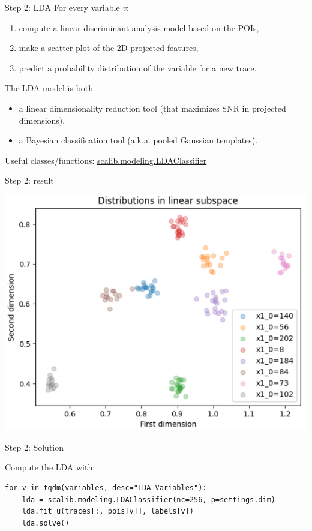 \documentclass[aspectratio=169]{beamer}
\begin{document}
\begin{frame}{Step 2: LDA}
    For every variable $v$:
    \begin{enumerate}
        \item compute a linear discriminant analysis model based on the POIs,
        \item make a scatter plot of the 2D-projected features,
        \item predict a probability distribution of the variable for a new trace.
    \end{enumerate}

    The LDA model is both
    \begin{itemize}
        \item a linear dimensionality reduction tool (that maximizes SNR in projected dimensions),
        \item a Bayesian classification tool (a.k.a. pooled Gaussian templates).
    \end{itemize}

    Useful classes/functions:
    \href{https://scalib.readthedocs.io/en/stable/source/api/scalib.modeling.LDAClassifier.html}{scalib.modeling.LDAClassifier}
\end{frame}

\begin{frame}{Step 2: result}
    \begin{center}
        \includegraphics[width=.6\textwidth]{figures/res_step2.png}
    \end{center}
\end{frame}


\begin{frame}[containsverbatim]{Step 2: Solution}

Compute the LDA with:
\begin{verbatim}
for v in tqdm(variables, desc="LDA Variables"):
    lda = scalib.modeling.LDAClassifier(nc=256, p=settings.dim)
    lda.fit_u(traces[:, pois[v]], labels[v])
    lda.solve()
\end{verbatim}

\end{frame}
\end{document}
